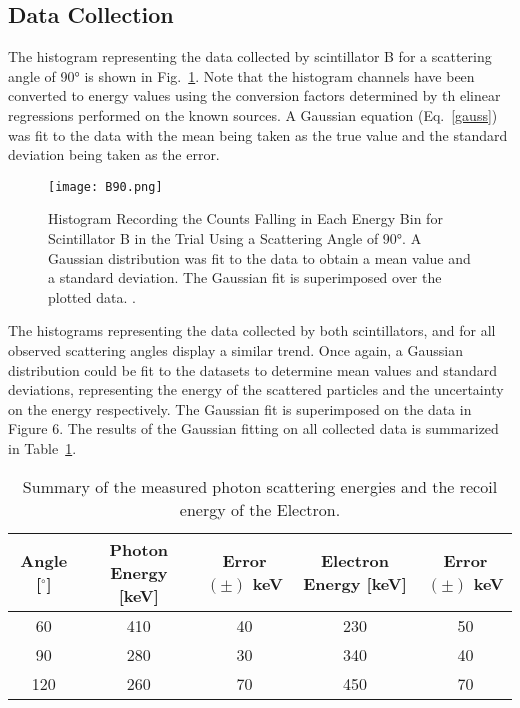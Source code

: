 \documentclass[prb,preprint,groupaddress,showpacs,superbib,floats]{revtex4-1}
\begin{document}
\subsection{Data Collection}

The histogram representing the data collected by scintillator B for a scattering angle of 90° is shown in Fig.~\ref{B90}. Note that the histogram channels have been converted to energy values using the conversion factors determined by th elinear regressions performed on the known sources. A Gaussian equation (Eq.~\ref{gauss}) was fit to the data with the mean being taken as the true value and the standard deviation being taken as the error. 
%
\begin{figure}[htp]
	\centering
	\texttt{[image: B90.png]}
	\caption{Histogram Recording the Counts Falling in Each Energy Bin for Scintillator B in the Trial Using a Scattering Angle of 90°. A Gaussian distribution was fit to the data to obtain a mean value and a 				standard deviation. The Gaussian fit is superimposed over the plotted data. .}
	\label{B90}
\end{figure}

The histograms representing the data collected by both scintillators, and for all observed scattering angles display a similar trend. Once again, a Gaussian distribution could be fit to the datasets to determine mean values and standard deviations, representing the energy of the scattered particles and the uncertainty on the energy respectively. The Gaussian fit is superimposed on the data in Figure 6. The results of the Gaussian fitting on all collected data is summarized in Table~\ref{scattered energies}. 

%

\begin{table}[h]
	\begin{ruledtabular}
		\begin{tabular}{ccccc}
			
			\textbf{Angle [$^{\circ}$]} & \textbf{Photon Energy [keV]} & \textbf{Error $(\pm)$ keV}  & \textbf{Electron Energy [keV]} & \textbf{Error $(\pm)$ keV} \\ 
			\hline
			60 & 410  & 40 & 230 & 50 \\ 
			90 & 280 & 30 & 340 & 40 \\ 
			120 & 260 & 70 & 450 & 70 \\ 
			
		\end{tabular}
	\end{ruledtabular}
	\caption{Summary of the measured photon scattering energies and the recoil energy of the Electron. }
	\label{scattered energies}
\end{table}
\end{document}
